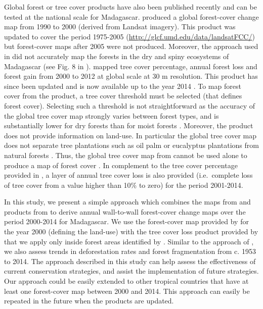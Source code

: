 \documentclass[]{article}
\begin{document}
Global forest or tree cover products have also been published recently
and can be tested at the national scale for Madagascar. \citep{Kim2014}
produced a global forest-cover change map from 1990 to 2000 (derived
from Landsat imagery). This product was updated to cover the period
1975-2005 (\url{http://glcf.umd.edu/data/landsatFCC/}) but forest-cover
maps after 2005 were not produced. Moreover, the approach used in
\citet{Kim2014} did not accurately map the forests in the dry and spiny
ecosystems of Madagascar (see Fig. 8 in \citet{Kim2014}).
\citet{Hansen2013} mapped tree cover percentage, annual forest loss and
forest gain from 2000 to 2012 at global scale at 30 m resolution. This
product has since been updated and is now available up to the year 2014
\citep{Hansen2013}. To map forest cover from the \citet{Hansen2013}
product, a tree cover threshold must be selected (that defines forest
cover). Selecting such a threshold is not straightforward as the
accuracy of the global tree cover map strongly varies between forest
types, and is substantially lower for dry forests than for moist forests
\citep{Bastin2017}. Moreover, the \citet{Hansen2013} product does not
provide information on land-use. In particular the global tree cover map
does not separate tree plantations such as oil palm or eucalyptus
plantations from natural forests \citep{Tropek2014}. Thus, the global
tree cover map from \citet{Hansen2013} cannot be used alone to produce a
map of forest cover \citep{Tyukavina2017}. In complement to the tree
cover percentage provided in \citet{Hansen2013}, a layer of annual tree
cover loss is also provided (i.e.~complete loss of tree cover from a
value higher than 10\% to zero) for the period 2001-2014.

In this study, we present a simple approach which combines the maps from
\citet{Harper2007} and products from \citet{Hansen2013} to derive annual
wall-to-wall forest-cover change maps over the period 2000-2014 for
Madagascar. We use the forest-cover map provided by \citet{Harper2007}
for the year 2000 (defining the land-use) with the tree cover loss
product provided by \citet{Hansen2013} that we apply only inside forest
areas identified by \citet{Harper2007}. Similar to the approach of
\citet{Harper2007}, we also assess trends in deforestation rates and
forest fragmentation from c. 1953 to 2014. The approach described in
this study can help assess the effectiveness of current conservation
strategies, and assist the implementation of future strategies. Our
approach could be easily extended to other tropical countries that have
at least one forest-cover map between 2000 and 2014. This approach can
easily be repeated in the future when the \citet{Hansen2013} products
are updated.
\end{document}
